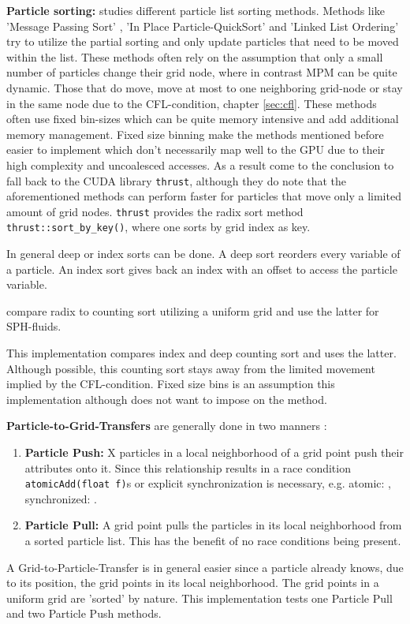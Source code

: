\documentclass[m,times]{cgMA}
\begin{document}
\textbf{Particle sorting:} \cite{PIC:GPU} studies different particle list sorting methods. Methods like 'Message Passing Sort' \cite{kong2011particle} \cite{decyk2011adaptable}, 'In Place Particle-QuickSort' \cite{stantchev2008fast} and 'Linked List Ordering' \cite{burau2010picongpu} try to utilize the partial sorting and only update particles that need to be moved within the list. These methods often rely on the assumption that only a small number of particles change their grid node, where in contrast MPM can be quite dynamic. Those that do move, move at most to one neighboring grid-node or stay in the same node due to the CFL-condition, chapter \ref{sec:cfl}. These methods often use fixed bin-sizes which can be quite memory intensive and add additional memory management. Fixed size binning make the methods mentioned before easier to implement which don't necessarily map well to the GPU due to their high complexity and uncoalesced accesses. As a result \cite{PIC:GPU} come to the conclusion to fall back to the CUDA library \texttt{thrust}, although they do note that the aforementioned methods can perform faster for particles that move only a limited amount of grid nodes. \texttt{thrust} provides the radix sort method \texttt{thrust::sort\_by\_key()}, where one sorts by grid index as key.

In general deep or index sorts can be done. A deep sort reorders every variable of a particle. An index sort gives back an index with an offset to access the particle variable.

\cite{NVIDIA:NNSEARCH} compare radix to counting sort utilizing a uniform grid and use the latter for SPH-fluids.

This implementation compares index and deep counting sort and uses the latter. Although possible, this counting sort stays away from the limited movement implied by the CFL-condition. Fixed size bins is an assumption this implementation although does not want to impose on the method.

\textbf{Particle-to-Grid-Transfers} are generally done in two manners \cite{stantchev2008fast}:
\begin{enumerate}
  \item \textbf{Particle Push:} X particles in a local neighborhood of a grid point push their attributes onto it. Since this relationship results in a race condition \texttt{atomicAdd(float f)}s or explicit synchronization is necessary, e.g. a\-tomic: \cite{PIC:GPU}, synchronized: \cite{FRANCESCO:ROSSI}.
  \item \textbf{Particle Pull:} A grid point pulls the particles in its local neighborhood from a sorted particle list. This has the benefit of no race conditions being present.
\end{enumerate}
A Grid-to-Particle-Transfer is in general easier since a particle already knows, due to its position, the grid points in its local neighborhood. The grid points in a uniform grid are 'sorted' by nature. This implementation tests one Particle Pull and two Particle Push methods.
\end{document}
